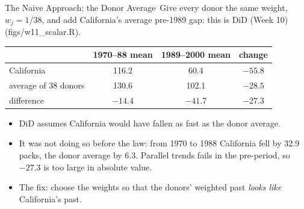 \documentclass[aspectratio=169,11pt,xcolor=dvipsnames]{beamer}
\newcommand{\srcp}[1]{{\scriptsize\color{gray}(#1)}}
\newcommand{\core}{\,\raisebox{0.6pt}{\textcolor{corestar}{$\bigstar$}}}
\begin{document}
\begin{frame}{The Naive Approach: the Donor Average\core}
Give every donor the same weight, $w_j = 1/38$, and add California's average
pre-1989 gap: this is DiD (Week 10) \srcp{figs/w11\_scalar.R}.
\vskip3pt
\begin{center}\small
\renewcommand{\arraystretch}{1.12}
\begin{tabular}{@{}lccc@{}}
\toprule
 & 1970--88 mean & 1989--2000 mean & change \\
\midrule
California & 116.2 & 60.4 & $-55.8$ \\
average of 38 donors & 130.6 & 102.1 & $-28.5$ \\
\midrule
difference & $-14.4$ & $-41.7$ & $\mathbf{-27.3}$ \\
\bottomrule
\end{tabular}
\end{center}
\vskip3pt
\begin{itemize}\itemsep2pt
  \item DiD assumes California would have fallen as fast as the donor average.
  \item It was not doing so before the law: from 1970 to 1988 California fell by
        32.9 packs, the donor average by 6.3. Parallel trends fails in the
        pre-period, so $-27.3$ is too large in absolute value.
  \item The fix: choose the weights so that the donors' weighted past
        \emph{looks like} California's past.
\end{itemize}
\end{frame}
\end{document}
